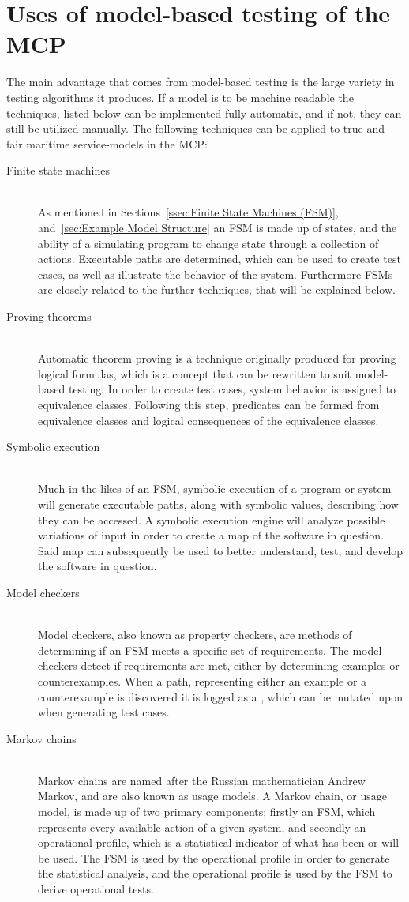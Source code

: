 \section{Uses of model-based testing of the MCP}
The main advantage that comes from model-based testing is the large variety in testing algorithms it produces. If a model is to be machine readable the techniques, listed below can be implemented fully automatic, and if not, they can still be utilized manually. The following techniques can be applied to true and fair maritime service-models in the MCP: \newpage
\begin{description}
  \item[Finite state machines]\ \\
    As mentioned in Sections~\ref{ssec:Finite State Machines (FSM)}, and~\ref{sec:Example Model Structure} an FSM is made up of states, and the ability of a simulating program to change state through a collection of actions. Executable paths are determined, which can be used to create test cases, as well as illustrate the behavior of the system. Furthermore FSMs are closely related to the further techniques, that will be explained below.
  \item[Proving theorems]\ \\
    Automatic theorem proving is a technique originally produced for proving logical formulas, which is a concept that can be rewritten to suit model-based testing. In order to create test cases, system behavior is assigned to equivalence classes. Following this step, predicates can be formed from equivalence classes and logical consequences of the equivalence classes. 
  \item[Symbolic execution]\ \\
    Much in the likes of an FSM, symbolic execution of a program or system will generate executable paths, along with symbolic values, describing how they can be accessed. A symbolic execution engine will analyze possible variations of input in order to create a map of the software in question. Said map can subsequently be used to better understand, test, and develop the software in question.
  \item[Model checkers]\ \\
    Model checkers, also known as property checkers, are methods of determining if an FSM meets a specific set of requirements. The model checkers detect if requirements are met, either by determining examples or counterexamples. When a path, representing either an example or a counterexample is discovered it is logged as a , which can be mutated upon when generating test cases.
  \item[Markov chains]\ \\
    Markov chains are named after the Russian mathematician Andrew Markov, and are also known as usage models. A Markov chain, or usage model, is made up of two primary components; firstly an FSM, which represents every available action of a given system, and secondly an operational profile, which is a statistical indicator of what has been or will be used. The FSM is used by the operational profile in order to generate the statistical analysis, and the operational profile is used by the FSM to derive operational tests.
\end{description}

